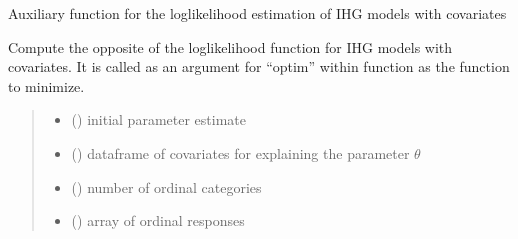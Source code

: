 \documentclass[letterpaper,10pt,english]{sphinxmanual}
\begin{document}
\begin{fulllineitems}
\label{\detokenize{cubmods:cubmods.ihg_v.effe}}
\pysigstartsignatures
{}
\pysigstopsignatures
\sphinxAtStartPar
Auxiliary function for the log\sphinxhyphen{}likelihood estimation of IHG models with covariates

\sphinxAtStartPar
Compute the opposite of the loglikelihood function for IHG models
with covariates.
It is called as an argument for “optim” within  function
as the function to minimize.
\begin{quote}\begin{description}
\begin{itemize}
\item {} 
\sphinxAtStartPar
{} () \textendash{} initial parameter estimate

\item {} 
\sphinxAtStartPar
{} () \textendash{} dataframe of covariates for explaining the parameter \(\theta\)

\item {} 
\sphinxAtStartPar
{} () \textendash{} number of ordinal categories

\item {} 
\sphinxAtStartPar
{} () \textendash{} array of ordinal responses

\end{itemize}

\end{description}\end{quote}

\end{fulllineitems}

\end{document}
